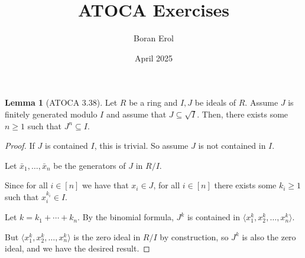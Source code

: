 \documentclass{article}
\title{ATOCA Exercises}
\date{April 2025}
\author{Boran Erol}
\theoremstyle{definition}
\newtheorem{lemma}[theorem]{Lemma}
\begin{document}
\maketitle

\begin{lemma}[ATOCA 3.38]
    Let $ R $ be a ring and $ I,J $ be ideals of $ R $.
    Assume $ J $ is finitely generated modulo $ I $ and
    assume that $ J \subseteq \sqrt{I} $. Then, there exists some
    $ n \geq 1 $ such that $ J^{n} \subseteq I $.
\end{lemma}
\begin{proof}
    If $ J $ is contained $ I $, this is trivial. So assume $ J $ is not contained in $ I $.

    Let $ \bar{x}_{1}, \ldots, \bar{x}_{n} $ be the generators of $ J $ in $ R/I $.

    Since for all $ i \in [n] $ we have that $ x_{i} \in J $, for all $ i \in [n] $
    there exists some $ k_{i} \geq 1 $ such that $ x_{i}^{k_{i}} \in I $.

    Let $ k = k_{1} + \cdots + k_{n} $. By the binomial formula, $ J^{k} $ is contained
    in $ \langle x_{1}^{k}, x_{2}^{k}, \ldots, x_{n}^{k} \rangle $.

    But $ \langle x_{1}^{k}, x_{2}^{k}, \ldots, x_{n}^{k} \rangle $ is the zero ideal in $ R/I $
    by construction, so $ J^{k} $ is also the zero ideal, and we have the desired result.
\end{proof}
\end{document}

